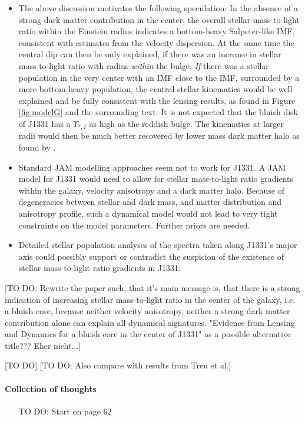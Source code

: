 \begin{itemize}
\item The above discussion motivates the following speculation: In the absence of a strong dark matter contribution in the center, the overall stellar-mass-to-light ratio within the Einstein radius indicates a bottom-heavy Salpeter-like IMF, consistent with estimates from the velocity dispersion. At the same time the central dip can then be only explained, if there was an increase in stellar mass-to-light ratio with radius \textit{within} the bulge. \emph{If} there was a stellar population in the very center with an IMF close to the \citet{Chabrier2003} IMF, surrounded by a more bottom-heavy population, the central stellar kinematics would be well explained and be fully consistent with the lensing results, as found in Figure \ref{fig:modelG} and the surrounding text. It is not expected that the bluish disk of J1331 has a $\Upsilon_{*,I}$ as high as the reddish bulge. The kinematics at larger radii would then be much better recovered by lower mass dark matter halo as found by \citet{SWELLSV}.
\item Standard JAM modelling approaches seem not to work for J1331. A JAM model for J1331 would need to allow for stellar mass-to-light ratio gradients within the galaxy, velocity anisotropy and a dark matter halo. Because of degeneracies between stellar and dark mass, and matter distribution and anisotropy profile, such a dynamical model would not lead to very tight constraints on the model parameters. Further priors are needed.
\item Detailed stellar population analyses of the spectra taken along J1331's major axis could possibly support or contradict the suspicion of the existence of stellar mass-to-light ratio gradients in J1331.
\end{itemize}

[TO DO: Rewrite the paper such, that it's main message is, that there is a strong indication of increasing stellar mass-to-light ratio in the center of the galaxy, i.e. a bluish core, because neither velocity anisotropy, neither a strong dark matter contribution alone can explain all dynamical signatures. "Evidence from Lensing and Dynamics for a bluish core in the center of J1331" as a possible alternative title??? Eher nicht...]

[TO DO] [TO DO: Also compare with results from Treu et al.]

\paragraph{Collection of thoughts}
\begin{itemize}
\item [TO DO: Start on page 62]
\end{itemize}

